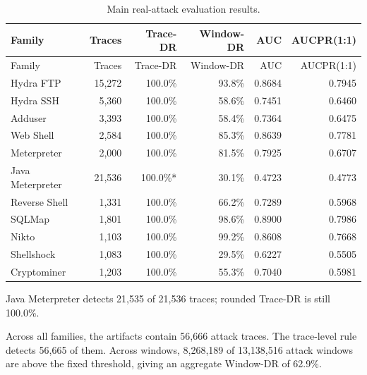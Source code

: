 \documentclass[11pt,a4paper]{article}
\begin{document}
\begin{longtable}{@{}lrrrrr@{}}
\caption{Main real-attack evaluation results.}
\label{tab:main-results}\\
\toprule
Family & Traces & Trace-DR & Window-DR & AUC & AUCPR(1:1) \\
\midrule
\endfirsthead
\toprule
Family & Traces & Trace-DR & Window-DR & AUC & AUCPR(1:1) \\
\midrule
\endhead
Hydra FTP & 15,272 & 100.0\% & 93.8\% & 0.8684 & 0.7945 \\
Hydra SSH & 5,360 & 100.0\% & 58.6\% & 0.7451 & 0.6460 \\
Adduser & 3,393 & 100.0\% & 58.4\% & 0.7364 & 0.6475 \\
Web Shell & 2,584 & 100.0\% & 85.3\% & 0.8639 & 0.7781 \\
Meterpreter & 2,000 & 100.0\% & 81.5\% & 0.7925 & 0.6707 \\
Java Meterpreter & 21,536 & 100.0\%* & 30.1\% & 0.4723 & 0.4773 \\
Reverse Shell & 1,331 & 100.0\% & 66.2\% & 0.7289 & 0.5968 \\
SQLMap & 1,801 & 100.0\% & 98.6\% & 0.8900 & 0.7986 \\
Nikto & 1,103 & 100.0\% & 99.2\% & 0.8608 & 0.7668 \\
Shellshock & 1,083 & 100.0\% & 29.5\% & 0.6227 & 0.5505 \\
Cryptominer & 1,203 & 100.0\% & 55.3\% & 0.7040 & 0.5981 \\
\bottomrule
\end{longtable}

\noindent *Java Meterpreter detects 21,535 of 21,536 traces; rounded Trace-DR is still 100.0\%.

Across all families, the artifacts contain 56,666 attack traces. The trace-level rule detects 56,665 of them. Across windows, 8,268,189 of 13,138,516 attack windows are above the fixed threshold, giving an aggregate Window-DR of 62.9\%.
\end{document}
